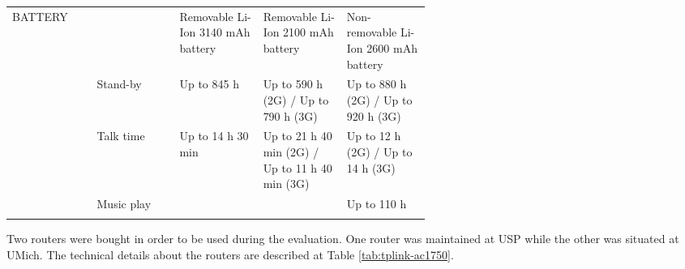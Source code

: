 \begin{longtable}{llp{0.2\linewidth}p{0.2\linewidth}p{0.2\linewidth}}
		BATTERY  &               & Removable Li-Ion 3140 mAh battery               & Removable Li-Ion 2100 mAh battery                                                           & Non-removable Li-Ion 2600 mAh battery                                                                          \\
		& Stand-by      & Up to 845 h                                     & Up to 590 h (2G) / Up to 790 h (3G)                                                         & Up to 880 h (2G) / Up to 920 h (3G)                                                                            \\
		& Talk time     & Up to 14 h 30 min                               & Up to 21 h 40 min (2G) / Up to 11 h 40 min (3G)                                             & Up to 12 h (2G) / Up to 14 h (3G)                                                                              \\
		& Music play    &                                                 &                                                                                             & Up to 110 h           \\ \hline                                                                                                                                                                                    
\label{tab:gsmarena-lg-s3-z3}
\end{longtable}

Two routers were bought in order to be used during the evaluation. 
One router was maintained at USP while the other was situated at UMich.
The technical details about the routers are described at Table \ref{tab:tplink-ac1750}.

